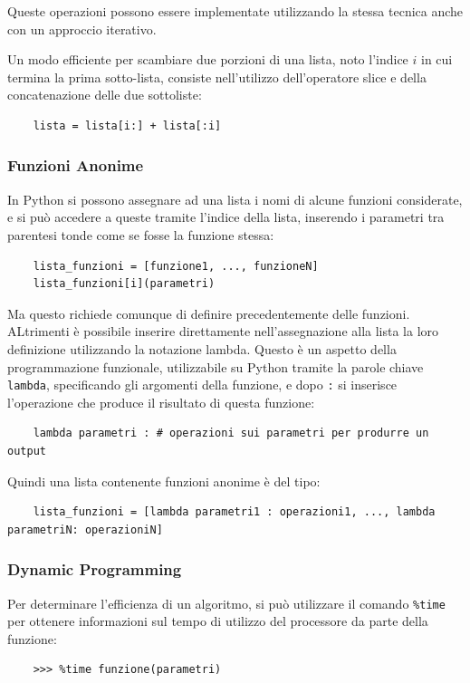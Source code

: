 \documentclass{article}
\numberwithin{equation}{subsection}
\begin{document}
Queste operazioni possono essere implementate utilizzando la stessa tecnica anche con un 
approccio iterativo. 


Un modo efficiente per scambiare due porzioni di una lista, noto l'indice $i$ in cui termina la 
prima sotto-lista, consiste nell'utilizzo dell'operatore 
slice e della concatenazione delle due sottoliste:
\begin{verbatim}
    lista = lista[i:] + lista[:i]
\end{verbatim}

\subsubsection{Funzioni Anonime}

In Python si possono assegnare ad una lista i nomi di alcune 
funzioni considerate, e si può accedere a queste tramite l'indice della lista, inserendo 
i parametri tra parentesi tonde come se fosse la funzione stessa:
\begin{verbatim}
    lista_funzioni = [funzione1, ..., funzioneN]
    lista_funzioni[i](parametri)
\end{verbatim}

Ma questo richiede comunque di definire precedentemente delle funzioni. ALtrimenti è possibile 
inserire direttamente nell'assegnazione alla lista la loro definizione utilizzando la 
notazione lambda. Questo è un aspetto della programmazione funzionale, utilizzabile su Python 
tramite la parole chiave \verb|lambda|, specificando gli argomenti della funzione, e dopo \verb|:| 
si inserisce l'operazione che produce il risultato di questa funzione:
\begin{verbatim}
    lambda parametri : # operazioni sui parametri per produrre un output
\end{verbatim}

Quindi una lista contenente funzioni anonime è del tipo:
\begin{verbatim}
    lista_funzioni = [lambda parametri1 : operazioni1, ..., lambda parametriN: operazioniN]
\end{verbatim}

\subsubsection{Dynamic Programming}

Per determinare l'efficienza di un algoritmo, si può utilizzare il comando \verb|%time| per 
ottenere informazioni sul tempo di utilizzo del processore da parte della funzione:
\begin{verbatim}
    >>> %time funzione(parametri)
\end{verbatim}
\end{document}
